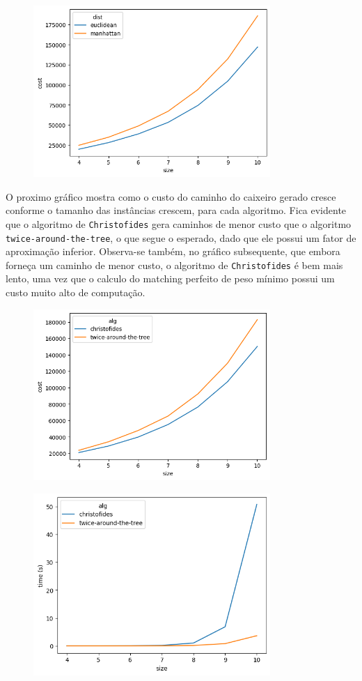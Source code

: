 \documentclass{article}
\begin{document}
\begin{figure} [H]
	\includegraphics[width=9cm]{images/distdiff.png}
	\centering
\end{figure}

O proximo gráfico mostra como o custo do caminho do caixeiro gerado cresce conforme o tamanho das instâncias crescem, para cada algoritmo. Fica evidente que o algoritmo de \texttt{Christofides} gera caminhos de menor custo que o algoritmo \texttt{twice-around-the-tree}, o que segue o esperado, dado que ele possui um fator de aproximação inferior. Observa-se também, no gráfico subsequente, que embora forneça um caminho de menor custo, o algoritmo de \texttt{Christofides} é bem mais lento, uma vez que o calculo do matching perfeito de peso mínimo possui um custo muito alto de computação. 

\begin{figure} [H]
	\includegraphics[width=9cm]{images/algcosts.png}
	\centering
\end{figure}

\begin{figure} [H]
	\includegraphics[width=9cm]{images/algtimes.png}
	\centering
\end{figure}
\end{document}
